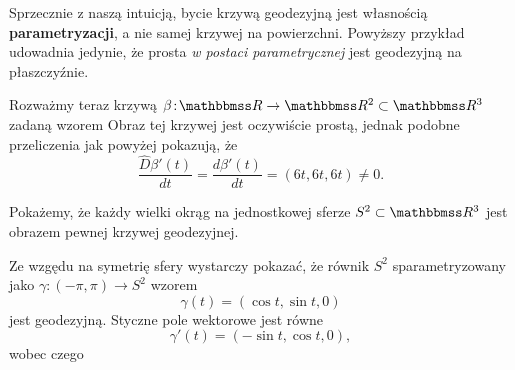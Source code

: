 \begin{frame}

\begin{uwaga}
Sprzecznie z naszą intuicją, bycie krzywą geodezyjną jest własnością \textbf{parametryzacji}, a nie samej krzywej na powierzchni. Powyższy przykład udowadnia jedynie, że prosta \textit{w postaci parametrycznej} jest geodezyjną na płaszczyźnie. \pause 

\bigskip
Rozważmy teraz krzywą $\beta\colon \R\to \R^2\subset \R^3$ zadaną wzorem
Obraz tej krzywej 
jest oczywiście prostą, jednak podobne przeliczenia jak powyżej pokazują, że 
\[\frac{\widehat{D}\beta'(t)}{dt}=\frac{d\beta'(t)}{dt}=(6t,6t,6t)\neq 0.\]
\end{uwaga}

\end{frame}
\begin{frame}
Pokażemy, że każdy wielki okrąg na jednostkowej sferze $S^2\subset \R^3$ jest obrazem pewnej krzywej geodezyjnej. 

Ze wzgędu na symetrię sfery wystarczy pokazać, że równik $S^2$ sparametryzowany jako $\gamma\colon (-\pi,\pi)\to S^2$ wzorem \[\gamma(t)=(\cos t,\sin t,0)\] jest geodezyjną. \pause Styczne pole wektorowe jest równe \[\gamma'(t)=(-\sin t, \cos t, 0),\] wobec czego
\end{frame}

